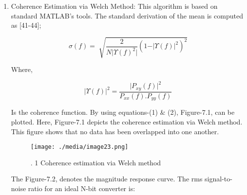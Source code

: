 \setlength{\parskip}{0.0pt}
\begin{enumerate}
	\item Coherence Estimation via Welch Method: This algorithm is based on standard MATLAB’s tools. The standard derivation of the mean is computed as [41-44];\par


\begin{equation}\tag{1}
 \sigma  \left( f \right) = \sqrt[]{\frac{2}{N \vert  \Upsilon  \left( f \right) ^{2} \vert } \left( 1- \vert  \Upsilon  \left( f \right)  \vert ^{2} \right) ^{2}}
\end{equation}
\begin{justify}
Where,
\end{justify}\par


\begin{equation}\tag{2}
 \vert  \Upsilon  \left( f \right)  \vert ^{2}= \frac{ \vert P_{xy} \left( f \right)  \vert ^{2}}{P_{xx} \left( f \right) .P_{yy} \left( f \right) }
\end{equation}
\begin{justify}
Is the coherence function. By using equations-(1) $\&$  (2), Figure-7.1, can be plotted. Here, Figure-7.1 depicts the coherence estimation via Welch method. This figure shows that no data has been overlapped into one another.
\end{justify}\par




\begin{figure}[H]
	\begin{Center}
		\texttt{[image: ./media/image23.png]}
		\caption{. 1 Coherence estimation via Welch method }
		\label{fig:_1_Coherence_estimation_via_Welch_method_}
	\end{Center}
\end{figure}



\par

\setlength{\parskip}{8.04pt}
\par

\setlength{\parskip}{0.0pt}
The Figure-7.2, denotes the magnitude response curve. The rms signal-to-noise ratio for an ideal N-bit converter is:\par



\end{enumerate}
